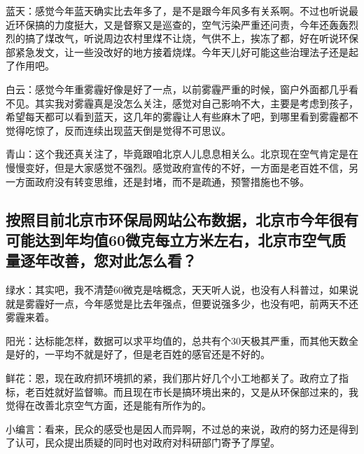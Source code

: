 \documentclass[
]{book}
\begin{document}
蓝天：感觉今年蓝天确实比去年多了，是不是跟今年风多有关系啊。不过也听说最近环保搞的力度挺大，又是督察又是巡查的，空气污染严重还问责，今年还轰轰烈烈的搞了煤改气，听说周边农村里煤不让烧，气供不上，挨冻了都，好在听说环保部紧急发文，让一些没改好的地方接着烧煤。今年天儿好可能这些治理法子还是起了作用吧。

白云：感觉今年重雾霾好像是好了一点，以前雾霾严重的时候，窗户外面都几乎看不见。其实我对雾霾真是没怎么关注，感觉对自己影响不大，主要是考虑到孩子，希望每天都可以看到蓝天，这几年的雾霾让人有些麻木了吧，到哪里看到雾霾都不觉得吃惊了，反而连续出现蓝天倒是觉得不可思议。

青山：这个我还真关注了，毕竟跟咱北京人儿息息相关么。北京现在空气肯定是在慢慢变好，但是大家感觉不强烈。感觉政府宣传的不好，一方面是老百姓不信，另一方面政府没有转变思维，还是封堵，而不是疏通，预警措施也不够。

\hypertarget{ux6309ux7167ux76eeux524dux5317ux4eacux5e02ux73afux4fddux5c40ux7f51ux7ad9ux516cux5e03ux6570ux636eux5317ux4eacux5e02ux4ecaux5e74ux5f88ux6709ux53efux80fdux8fbeux5230ux5e74ux5747ux503c60ux5faeux514bux6bcfux7acbux65b9ux7c73ux5de6ux53f3ux5317ux4eacux5e02ux7a7aux6c14ux8d28ux91cfux9010ux5e74ux6539ux5584ux60a8ux5bf9ux6b64ux600eux4e48ux770b}{%
\subsection{按照目前北京市环保局网站公布数据，北京市今年很有可能达到年均值60微克每立方米左右，北京市空气质量逐年改善，您对此怎么看？}\label{ux6309ux7167ux76eeux524dux5317ux4eacux5e02ux73afux4fddux5c40ux7f51ux7ad9ux516cux5e03ux6570ux636eux5317ux4eacux5e02ux4ecaux5e74ux5f88ux6709ux53efux80fdux8fbeux5230ux5e74ux5747ux503c60ux5faeux514bux6bcfux7acbux65b9ux7c73ux5de6ux53f3ux5317ux4eacux5e02ux7a7aux6c14ux8d28ux91cfux9010ux5e74ux6539ux5584ux60a8ux5bf9ux6b64ux600eux4e48ux770b}}

绿水：其实吧，我不清楚60微克是啥概念，天天听人说，也没有人科普过，如果说就是雾霾好一点，今年感觉是比去年强点，但要说强多少，也没有吧，前两天不还雾霾来着。

阳光：达标能怎样，数据可以求平均值的，总共有个30天极其严重，而其他天数全是好的，一平均不就是好了，但是老百姓的感官还是不好的。

鲜花：恩，现在政府抓环境抓的紧，我们那片好几个小工地都关了。政府立了指标，老百姓就好监督嘛。而且现在市长是搞环境出来的，又是从环保部过来的，我觉得在改善北京空气方面，还是能有所作为的。

小编言：看来，民众的感受也是因人而异啊，不过总的来说，政府的努力还是得到了认可，民众提出质疑的同时也对政府对科研部门寄予了厚望。
\end{document}
